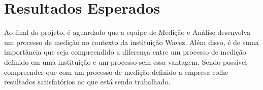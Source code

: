 \chapter{Resultados Esperados}

Ao final do projeto, é aguardado que a equipe de Medição e Análise desenvolva um processo de medição no contexto da instituição Wavez. 
Além disso, é de suma importância que seja compreendido a diferença entre um processo de medição definido em uma instituição e um processo sem essa vantagem. Sendo possível compreender que com um processo de medição definido a empresa colhe resultados satisfatórios no que está sendo trabalhado.